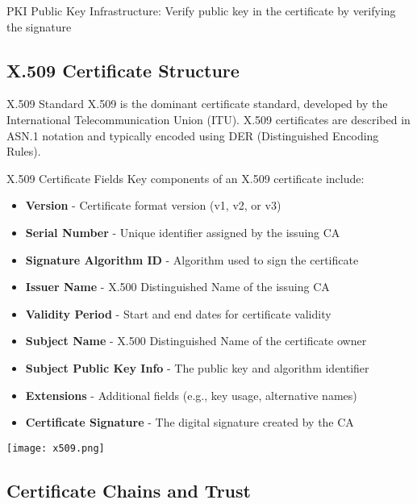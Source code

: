 \begin{concept}{PKI} Public Key Infrastructure:
    Verify public key in the certificate by verifying the signature
\end{concept}


\subsection{X.509 Certificate Structure}

\begin{definition}{X.509 Standard}
X.509 is the dominant certificate standard, developed by the International Telecommunication Union (ITU). X.509 certificates are described in ASN.1 notation and typically encoded using DER (Distinguished Encoding Rules).
\end{definition}

\begin{concept}{X.509 Certificate Fields}
Key components of an X.509 certificate include:
\begin{itemize}
    \item \textbf{Version} - Certificate format version (v1, v2, or v3)
    \item \textbf{Serial Number} - Unique identifier assigned by the issuing CA
    \item \textbf{Signature Algorithm ID} - Algorithm used to sign the certificate
    \item \textbf{Issuer Name} - X.500 Distinguished Name of the issuing CA
    \item \textbf{Validity Period} - Start and end dates for certificate validity
    \item \textbf{Subject Name} - X.500 Distinguished Name of the certificate owner
    \item \textbf{Subject Public Key Info} - The public key and algorithm identifier
    \item \textbf{Extensions} - Additional fields (e.g., key usage, alternative names)
    \item \textbf{Certificate Signature} - The digital signature created by the CA
\end{itemize}
\texttt{[image: x509.png]}
\end{concept}

\subsection{Certificate Chains and Trust}

